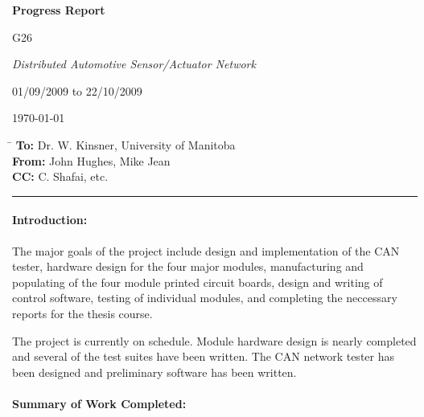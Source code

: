 \textwidth=6in
\textheight=8in
\topmargin=0.5in
\oddsidemargin=0.25in
\evensidemargin=0.25in
\headheight=0in
\footheight=0in
\headsep=0in


\centerline{\Large \bf Progress Report}
\bigskip
\bigskip

 G26
\bigskip

 {\it Distributed Automotive Sensor/Actuator Network}
\bigskip

 01/09/2009 to 22/10/2009
\bigskip

 \today

\begin{tabbing}
 \hspace{50pt}\=\kill
 {\bf To:} \> Dr. W. Kinsner, University of Manitoba \\ 
 {\bf From:} \> John Hughes, Mike Jean \\
 {\bf CC:} \> C. Shafai, etc.
\end{tabbing}

\hrule
\bigskip

\paragraph{Introduction:}

The major goals of the project include design and implementation of the CAN tester, hardware design for the four major modules, manufacturing and populating of the four module printed circuit boards, design and writing of control software, testing of individual modules, and completing the neccessary reports for the thesis course. 

The project is currently on schedule. Module hardware design is nearly completed and several of the test suites have been  written. The CAN network tester has been designed and preliminary software has been written.

\paragraph{Summary of Work Completed:}

